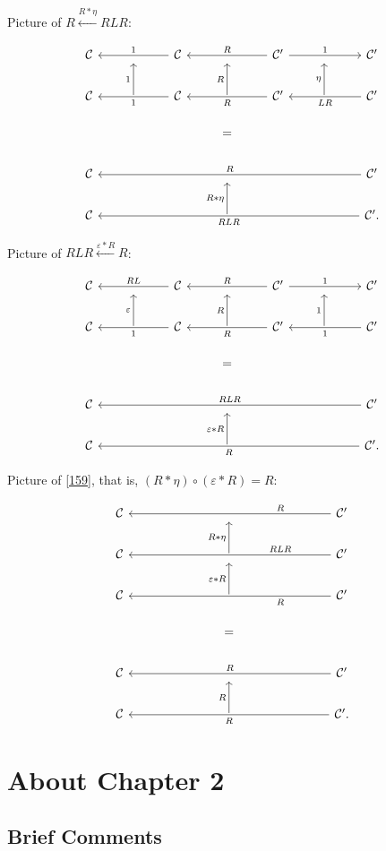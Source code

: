 \documentclass[12pt]{article}%
\theoremstyle{remark}
\theoremstyle{definition}
\newcommand{\C}{\mathcal C}
\newcommand{\ee}{\varepsilon}
\begin{document}
Picture of $R\xleftarrow{R*\eta}RLR$:
 
$$
\begin{tikzcd}
%
\C&{}&\C\ar{ll}{}[swap]{1}&{}&\C'\ar{ll}{}[swap]{R}\ar{rr}{}{1}&{}&\C'\\ 
%
\C&\ar{u}{1}&\C\ar{ll}{}{1}&\ar{u}{R}&\C'\ar{ll}{}{R}&\ar{u}{\eta}&\C'\ar{ll}{}{LR}\\ 
%
&&&=\\ 
%
\C&&&{}&&&\C'\ar{llllll}[swap]{R}\\
%
\C&&&\ar{u}{R*\eta}&&&\C'\ar{llllll}{RLR}.
%
\end{tikzcd}
$$ 

Picture of $RLR\xleftarrow{\ee*R}R$:

$$
\begin{tikzcd}
%
\C&{}&\C\ar{ll}{}[swap]{RL}&{}&\C'\ar{ll}{}[swap]{R}\ar{rr}{}{1}&{}&\C'\\ 
%
\C&\ar{u}{\ee}&\C\ar{ll}{}{1}&\ar{u}{R}&\C'\ar{ll}{}{R}&\ar{u}{1}&\C'\ar{ll}{}{1}\\ 
%
&&&=\\ 
%
\C&&&{}&&&\C'\ar{llllll}[swap]{RLR}\\
%
\C&&&\ar{u}{\ee*R}&&&\C'\ar{llllll}{R}.
%
\end{tikzcd}
$$ 

Picture of \eqref{159}, that is, $(R*\eta)\circ(\ee*R)=R$:

$$
\begin{tikzcd}
%
\C&&&{}&&&\C'\ar{llllll}[near start,swap]{R}\\
%
\C&&&\ar{u}{R*\eta}&&&\C'\ar{llllll}[near start,swap]{RLR}\\
%
\C&&&\ar{u}{\ee*R}&&&\C'\ar{llllll}[near start]{R}\\ 
%
&&&=\\ 
%
\C&&&{}&&&\C'\ar{llllll}[swap]{R}\\ 
%
\C&&&\ar{u}{R}&&&\C'.\ar{llllll}{R}
%
\end{tikzcd}
$$


\section{About Chapter 2}

\subsection{Brief Comments}
\end{document}
